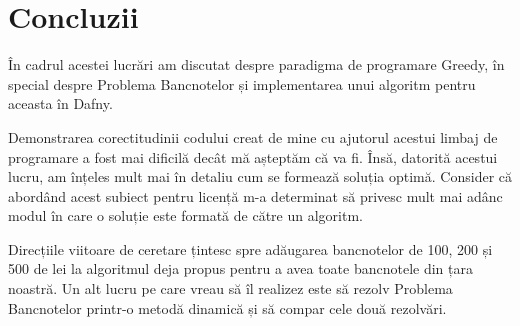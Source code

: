 \chapter*{Concluzii} 

În cadrul acestei lucrări am discutat despre paradigma de programare Greedy, în special despre Problema Bancnotelor și implementarea unui algoritm  pentru aceasta în Dafny. \par
Demonstrarea corectitudinii codului creat de mine cu ajutorul acestui limbaj de programare a fost mai dificilă decât mă așteptăm că va fi. Însă, datorită acestui lucru, am înțeles mult mai în detaliu cum se formează soluția optimă. Consider că abordând acest subiect pentru licență m-a determinat să privesc mult mai adânc modul în care o soluție este formată de către un algoritm. \par 
Direcțiile viitoare de ceretare țintesc spre adăugarea bancnotelor de 100, 200 și 500 de lei la algoritmul deja propus pentru a avea toate bancnotele din țara noastră. Un alt lucru pe care vreau să îl realizez este să rezolv Problema Bancnotelor printr-o metodă dinamică și să compar cele două rezolvări.